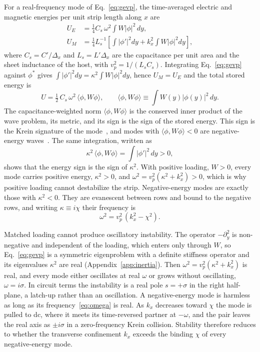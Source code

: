\documentclass[aps,prapplied,twocolumn,superscriptaddress,floatfix,longbibliography]{revtex4-2}
\begin{document}
For a real-frequency mode of Eq.~\eqref{eq:gevp}, the time-averaged electric and magnetic energies per unit strip length along $x$ are
\begin{align}
U_E&=\tfrac14 C_s\,\omega^2\!\int W|\phi|^2\,dy,\\
U_M&=\tfrac14 L_s^{-1}\!\left[\int|\phi'|^2dy+k_x^2\!\int W|\phi|^2dy\right],
\end{align}
where $C_s=C'/\Delta_x$ and $L_s=L'\Delta_x$ are the capacitance per unit area and the sheet inductance of the host, with $v_p^2=1/(L_sC_s)$. Integrating Eq.~\eqref{eq:gevp} against $\phi^*$ gives $\int|\phi'|^2dy=\kappa^2\int W|\phi|^2dy$, hence $U_M=U_E$ and the total stored energy is
\begin{equation}
U=\tfrac12\,C_s\,\omega^2\,\langle\phi,W\phi\rangle,\qquad
\langle\phi,W\phi\rangle\equiv\int W(y)|\phi(y)|^2\,dy.
\label{eq:energy}
\end{equation}
The capacitance-weighted norm $\langle\phi,W\phi\rangle$ is the conserved inner product of the wave problem, its metric, and its sign is the sign of the stored energy. This sign is the Krein signature of the mode~\cite{Kapitula_2013:book,Kollar_2014:SIREV}, and modes with $\langle\phi,W\phi\rangle<0$ are negative-energy waves~\cite{Cairns_1979:JFM}. The same integration, written as
\begin{equation}
\kappa^2\,\langle\phi,W\phi\rangle=\int|\phi'|^2\,dy>0,
\label{eq:lock}
\end{equation}
shows that the energy sign is the sign of $\kappa^2$. With positive loading, $W>0$, every mode carries positive energy, $\kappa^2>0$, and $\omega^2=v_p^2(\kappa^2+k_x^2)>0$, which is why positive loading cannot destabilize the strip. Negative-energy modes are exactly those with $\kappa^2<0$. They are evanescent between rows and bound to the negative rows, and writing $\kappa\equiv i\chi$ their frequency is
\begin{equation}
\omega^2=v_p^2\,(k_x^2-\chi^2).
\label{eq:omega}
\end{equation}

Matched loading cannot produce oscillatory instability. The operator $-\partial_y^2$ is non-negative and independent of the loading, which enters only through $W$, so Eq.~\eqref{eq:gevp} is a symmetric eigenproblem with a definite stiffness operator and its eigenvalues $\kappa^2$ are real (Appendix~\ref{app:inertia}). Then $\omega^2=v_p^2(\kappa^2+k_x^2)$ is real, and every mode either oscillates at real $\omega$ or grows without oscillating, $\omega=i\sigma$. In circuit terms the instability is a real pole $s=+\sigma$ in the right half-plane, a latch-up rather than an oscillation. A negative-energy mode is harmless as long as its frequency~\eqref{eq:omega} is real. As $k_x$ decreases toward $\chi$ the mode is pulled to dc, where it meets its time-reversed partner at $-\omega$, and the pair leaves the real axis as $\pm i\sigma$ in a zero-frequency Krein collision. Stability therefore reduces to whether the transverse confinement $k_x$ exceeds the binding $\chi$ of every negative-energy mode.
\end{document}
